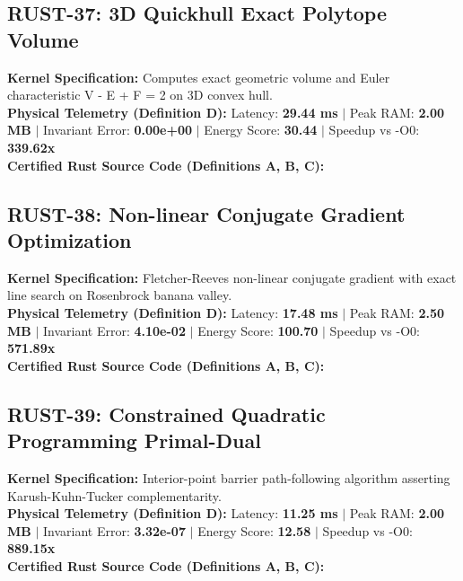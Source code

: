 \vspace{1em}
\subsection{RUST-37: 3D Quickhull Exact Polytope Volume}
\textbf{Kernel Specification:} Computes exact geometric volume and Euler characteristic V - E + F = 2 on 3D convex hull.\\
\textbf{Physical Telemetry (Definition D):} Latency: \textbf{29.44 ms} $|$ Peak RAM: \textbf{2.00 MB} $|$ Invariant Error: \textbf{0.00e+00} $|$ Energy Score: \textbf{30.44} $|$ Speedup vs -O0: \textbf{339.62x}\\

\textbf{Certified Rust Source Code (Definitions A, B, C):}


\vspace{1em}
\subsection{RUST-38: Non-linear Conjugate Gradient Optimization}
\textbf{Kernel Specification:} Fletcher-Reeves non-linear conjugate gradient with exact line search on Rosenbrock banana valley.\\
\textbf{Physical Telemetry (Definition D):} Latency: \textbf{17.48 ms} $|$ Peak RAM: \textbf{2.50 MB} $|$ Invariant Error: \textbf{4.10e-02} $|$ Energy Score: \textbf{100.70} $|$ Speedup vs -O0: \textbf{571.89x}\\

\textbf{Certified Rust Source Code (Definitions A, B, C):}


\vspace{1em}
\subsection{RUST-39: Constrained Quadratic Programming Primal-Dual}
\textbf{Kernel Specification:} Interior-point barrier path-following algorithm asserting Karush-Kuhn-Tucker complementarity.\\
\textbf{Physical Telemetry (Definition D):} Latency: \textbf{11.25 ms} $|$ Peak RAM: \textbf{2.00 MB} $|$ Invariant Error: \textbf{3.32e-07} $|$ Energy Score: \textbf{12.58} $|$ Speedup vs -O0: \textbf{889.15x}\\

\textbf{Certified Rust Source Code (Definitions A, B, C):}



